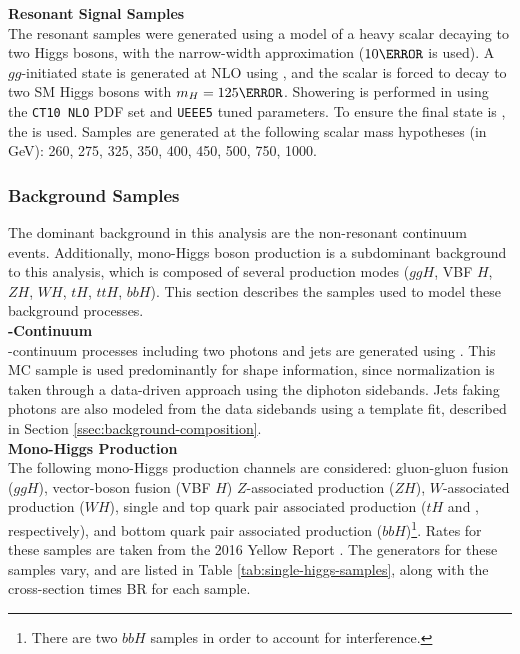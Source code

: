 \noindent\textbf{Resonant Signal Samples}\\
\indent The resonant samples were generated using a model of a heavy scalar decaying to two Higgs bosons, with the narrow-width approximation ($\unit{10}{\MeV}$ is used). A $gg$-initiated state is generated at NLO using \AMCatNLO, and the scalar is forced to decay to two \gls{SM} Higgs bosons with $m_H = \unit{125}{\GeV}$. Showering is performed in \HERWIGpp using the \texttt{CT10 NLO} \gls{PDF} set and \texttt{UEEE5} tuned parameters. To ensure the final state is \yybb, the  is used. Samples are generated at the following scalar mass hypotheses (in GeV): 260, 275, 325, 350, 400, 450, 500, 750, 1000.


\subsubsection{Background Samples}\label{sssec:background-samples}

The dominant background in this analysis are the non-resonant \myy continuum events. Additionally, mono-Higgs boson production is a subdominant background to this analysis, which is composed of several production modes ($ggH$, VBF $H$, $ZH$, $WH$, $tH$, $ttH$, $bbH$). This section describes the samples used to model these background processes.\\

\noindent\textbf{\yy-Continuum}\\
\indent \yy-continuum processes including two photons and jets are generated using \SHERPA. This \gls{MC} sample is used predominantly for shape information, since normalization is taken through a data-driven approach using the diphoton sidebands. Jets faking photons are also modeled from the data sidebands using a template fit, described in Section \ref{ssec:background-composition}.\\

\noindent\textbf{Mono-Higgs Production}\\
\indent The following mono-Higgs production channels are considered: gluon-gluon fusion ($ggH$), vector-boson fusion (VBF $H$) $Z$-associated production ($ZH$), $W$-associated production ($WH$), single and top quark pair associated production ($tH$ and \tth, respectively), and bottom quark pair associated production ($bbH$)\footnote{There are two $bbH$ samples in order to account for interference.}. Rates for these samples are taken from the 2016 Yellow Report \cite{yellow-report}. The generators for these samples vary, and are listed in Table \ref{tab:single-higgs-samples}, along with the cross-section times \gls{BR} for each sample.

